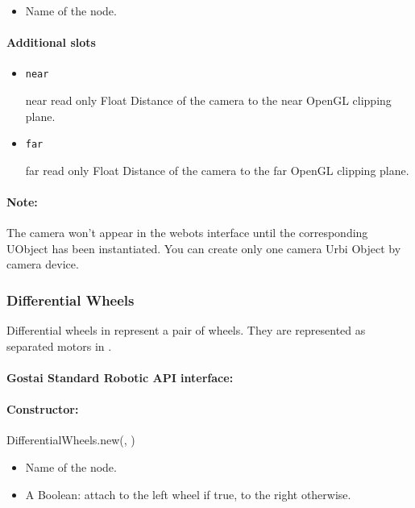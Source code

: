 \begin{itemize}
\item {} Name of the \webots node.
\end{itemize}

\paragraph{Additional slots}

\begin{itemize}
\item \lstinline{near}
\begin{attribute}{near}
  {read only}
  {Float}
  {}
  Distance of the camera to the near OpenGL clipping
  plane.
\end{attribute}

\item \lstinline|far|
\begin{attribute}{far}
  {read only}
  {Float}
  {}
  Distance of the camera to the far OpenGL clipping
  plane.
\end{attribute}
\end{itemize}

\paragraph{Note:} The \webots camera won't appear in the webots interface until the
corresponding UObject has been instantiated. You can create only one
camera Urbi Object by \webots camera device.

\subsubsection{Differential Wheels}

Differential wheels in \webots represent a pair of wheels. They are
represented as separated motors in \urbi.

\paragraph{Gostai Standard Robotic API interface:} 

\paragraph{Constructor: } DifferentialWheels.new(, )

\begin{itemize}
\item {} Name of the \webots node.
\item {} A Boolean: attach to the left wheel if true, to the
  right otherwise.
\end{itemize}


